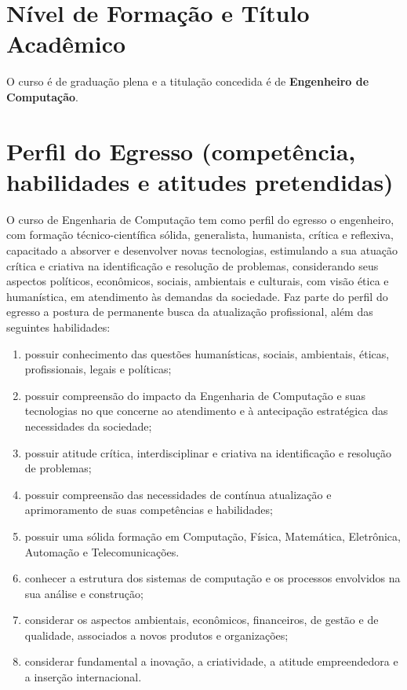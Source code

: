 \section{Nível de Formação e Título Acadêmico}

O curso é de graduação plena e a titulação concedida é de \textbf{Engenheiro de Computação}.

\section{Perfil do Egresso (competência, habilidades e atitudes pretendidas)}

O curso de Engenharia de Computação tem como perfil do egresso o engenheiro, com formação técnico-científica sólida, generalista, humanista, crítica e reflexiva, capacitado a absorver e desenvolver novas tecnologias, estimulando a sua atuação crítica e criativa na identificação e resolução de problemas, considerando seus aspectos políticos, econômicos, sociais, ambientais e culturais, com visão ética e humanística, em atendimento às demandas da sociedade. Faz parte do perfil do egresso a postura de permanente busca da atualização profissional, além das seguintes habilidades:
\begin{enumerate} [I -]
    \item possuir conhecimento das questões humanísticas, sociais, ambientais, éticas, profissionais, legais e políticas;
    \item possuir compreensão do impacto da Engenharia de Computação e suas tecnologias no que concerne ao atendimento e à antecipação estratégica das necessidades da sociedade;
    \item possuir atitude crítica, interdisciplinar e criativa na identificação e resolução de problemas;
    \item possuir compreensão das necessidades de contínua atualização e aprimoramento de suas competências e habilidades;
    \item possuir uma sólida formação em Computação, Física, Matemática, Eletrônica, Automação e Telecomunicações.
    \item conhecer a estrutura dos sistemas de computação e os processos envolvidos na sua análise e construção;
    \item considerar os aspectos ambientais, econômicos, financeiros, de gestão e de qualidade, associados a novos produtos e organizações;
    \item considerar fundamental a inovação, a criatividade, a atitude empreendedora e a inserção internacional.
\end{enumerate}

